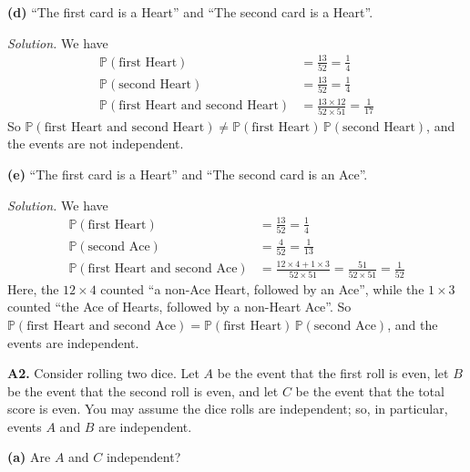 \documentclass[
  a4paper,
]{book}
\theoremstyle{definition}
\theoremstyle{definition}
\theoremstyle{definition}
\theoremstyle{definition}
\theoremstyle{remark}
\begin{document}
\textbf{(d)} ``The first card is a Heart'' and ``The second card is a Heart''.

\begin{myanswers}
\emph{Solution.}
We have
\begin{align*}
\mathbb P(\text{first Heart}) &= \frac{13}{52} = \frac14 \\
\mathbb P(\text{second Heart}) &= \frac{13}{52} = \frac14 \\
\mathbb P(\text{first Heart and second Heart}) &= \frac{13\times 12}{52 \times 51} = \frac{1}{17}
\end{align*}
So \(\mathbb P(\text{first Heart and second Heart}) \neq \mathbb P(\text{first Heart})\,\mathbb P(\text{second Heart})\), and the events are not independent.

\end{myanswers}

\textbf{(e)} ``The first card is a Heart'' and ``The second card is an Ace''.

\begin{myanswers}
\emph{Solution.}
We have
\begin{align*}
\mathbb P(\text{first Heart}) &= \frac{13}{52} = \frac14 \\
\mathbb P(\text{second Ace}) &= \frac{4}{52} = \frac1{13} \\
\mathbb P(\text{first Heart and second Ace}) &= \frac{12\times4 + 1\times 3}{52\times 51} = \frac{51}{52\times 51} = \frac{1}{52}
\end{align*}
Here, the \(12 \times 4\) counted ``a non-Ace Heart, followed by an Ace'', while the \(1 \times 3\) counted ``the Ace of Hearts, followed by a non-Heart Ace''. So \(\mathbb P(\text{first Heart and second Ace}) = \mathbb P(\text{first Heart})\,\mathbb P(\text{second Ace})\), and the events are independent.

\end{myanswers}

\textbf{A2.} Consider rolling two dice. Let \(A\) be the event that the first roll is even, let \(B\) be the event that the second roll is even, and let \(C\) be the event that the total score is even. You may assume the dice rolls are independent; so, in particular, events \(A\) and \(B\) are independent.

\textbf{(a)} Are \(A\) and \(C\) independent?
\end{document}
